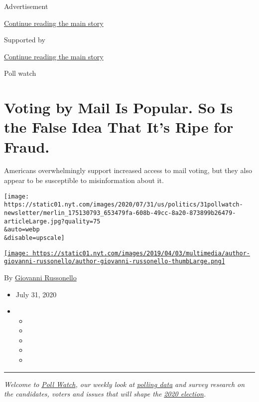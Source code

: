 Advertisement

\protect\hyperlink{after-top}{Continue reading the main story}

Supported by

\protect\hyperlink{after-sponsor}{Continue reading the main story}

Poll watch

\hypertarget{voting-by-mail-is-popular-so-is-the-false-idea-that-its-ripe-for-fraud}{%
\section{Voting by Mail Is Popular. So Is the False Idea That It's Ripe
for
Fraud.}\label{voting-by-mail-is-popular-so-is-the-false-idea-that-its-ripe-for-fraud}}

Americans overwhelmingly support increased access to mail voting, but
they also appear to be susceptible to misinformation about it.

\texttt{[image: https://static01.nyt.com/images/2020/07/31/us/politics/31pollwatch-newsletter/merlin\_175130793\_653479fa-608b-49cc-8a20-873899b26479-articleLarge.jpg?quality=75\\\&auto=webp\\\&disable=upscale]}

\href{https://www.nytimes.com/by/giovanni-russonello}{\texttt{[image: https://static01.nyt.com/images/2019/04/03/multimedia/author-giovanni-russonello/author-giovanni-russonello-thumbLarge.png]}}

By \href{https://www.nytimes.com/by/giovanni-russonello}{Giovanni
Russonello}

\begin{itemize}
\item
  July 31, 2020
\item
  \begin{itemize}
  \item
  \item
  \item
  \item
  \item
  \end{itemize}
\end{itemize}

\begin{center}\rule{0.5\linewidth}{\linethickness}\end{center}

\emph{Welcome to}
\href{https://www.nytimes.com/column/poll-watch}{\emph{Poll
Watch}}\emph{, our weekly look at}
\href{https://www.nytimes.com/interactive/2020/us/elections/democratic-polls.html}{\emph{polling
data}} \emph{and survey research on the candidates, voters and issues
that will shape the}
\href{https://www.nytimes.com/news-event/2020-election}{\emph{2020
election}}\emph{.}

